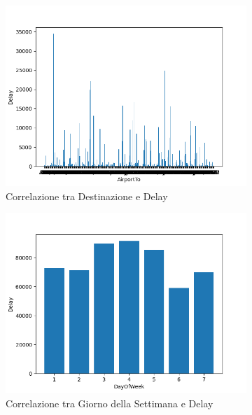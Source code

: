 \documentclass{article}
\begin{document}
\begin{figure}[H]
  \begin{subfigure}[b]{0.4\linewidth}
    \includegraphics[width=\linewidth]{AirportToDelayCorrelation}
    \caption{Correlazione tra Destinazione e Delay}
  \end{subfigure}
  \begin{subfigure}[b]{0.4\linewidth}
    \includegraphics[width=\linewidth]{DayOfWeekDelayCorrelation}
     \caption{Correlazione tra Giorno della Settimana e Delay}
  \end{subfigure}
  \begin{subfigure}[b]{0.4\linewidth}

\end{subfigure}
\end{figure}
\end{document}
